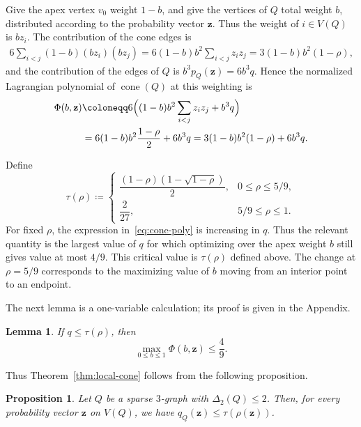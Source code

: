 \documentclass[10pt]{article}
\numberwithin{equation}{section}
\newtheorem{lemma}[theorem]{Lemma}
\newtheorem{proposition}[theorem]{Proposition}
\theoremstyle{definition}
\theoremstyle{remark}
\newcommand{\cone}{\operatorname{cone}}
\begin{document}
Give the apex vertex $v_0$ weight $1-b$, and give the vertices of $Q$ total weight $b$, distributed according to the probability vector $\mathbf{z}$. Thus the weight of $i\in V(Q)$ is $bz_i$. The contribution of the cone edges is
\[
\begin{aligned}
        6\sum_{i<j}(1-b)(bz_i)(bz_j)
        =6(1-b)b^2\sum_{i<j}z_iz_j  
        =3(1-b)b^2(1-\rho),
\end{aligned}
\]
and the contribution of the edges of $Q$ is $b^3p_Q(\mathbf{z})=6b^3q$. Hence the normalized Lagrangian polynomial of $\cone(Q)$ at this weighting is
\begin{align}\label{eq:cone-poly}
    \Phi(b,\mathbf{z})
        &\coloneqq 6\Big( (1-b)b^2\sum_{i<j}z_iz_j
             +b^3q \Big) \notag \\
        &=6(1-b)b^2\frac{1-\rho}{2}+6b^3q
        =3(1-b)b^2(1-\rho)+6b^3q.
\end{align}

Define
\begin{equation}\label{eq:tau-def}
        \tau(\rho) \coloneqq 
        \begin{cases}
        \dfrac{(1-\rho)(1-\sqrt{1-\rho})}{2},&0\le \rho\le 5/9,\\[1.2ex]
        \dfrac{2}{27},&5/9\le \rho\le 1.
        \end{cases}
\end{equation}
For fixed $\rho$, the expression in~\eqref{eq:cone-poly} is increasing in $q$. Thus the relevant quantity is the largest value of $q$ for which optimizing over the apex weight $b$ still gives value at most $4/9$. This critical value is $\tau(\rho)$ defined above. The change at $\rho=5/9$ corresponds to the maximizing value of $b$ moving from an interior point to an endpoint.

The next lemma is a one-variable calculation; its proof is given in the Appendix.

\begin{lemma}\label{lem:tau-threshold}
If $q\le\tau(\rho)$, then
\[
        \max_{0\le b\le1}\Phi(b,\mathbf{z})\le\frac49.
\]
\end{lemma}

Thus Theorem~\ref{thm:local-cone} follows from the following proposition.

\begin{proposition}\label{prop:q-tau}
Let $Q$ be a sparse $3$-graph with $\Delta_2(Q)\le2$. Then, for every probability vector $\mathbf{z}$ on $V(Q)$, we have $q_Q(\mathbf{z})\le \tau(\rho(\mathbf{z}))$.
\end{proposition}
\end{document}
